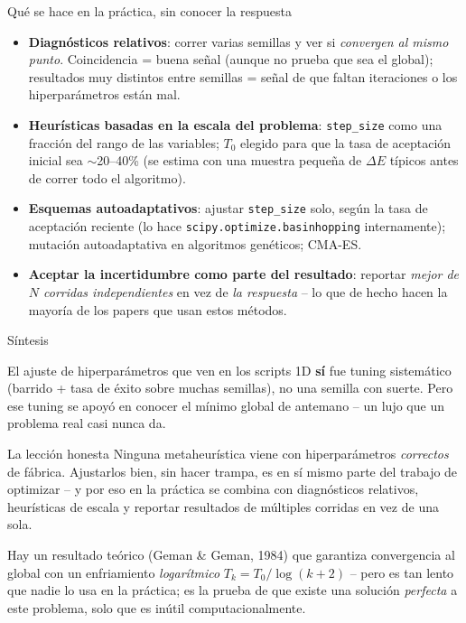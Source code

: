 \documentclass[aspectratio=169,10pt]{beamer}
\begin{document}
\begin{frame}{Qué se hace en la práctica, sin conocer la respuesta}
  \begin{itemize}
    \item \textbf{Diagnósticos relativos}: correr varias semillas y
      ver si \emph{convergen al mismo punto}. Coincidencia = buena
      señal (aunque no prueba que sea el global); resultados muy
      distintos entre semillas = señal de que faltan iteraciones o
      los hiperparámetros están mal.
    \item \textbf{Heurísticas basadas en la escala del problema}:
      \texttt{step\_size} como una fracción del rango de las
      variables; $T_0$ elegido para que la tasa de aceptación inicial
      sea $\sim$20--40\% (se estima con una muestra pequeña de
      $\Delta E$ típicos antes de correr todo el algoritmo).
    \item \textbf{Esquemas autoadaptativos}: ajustar
      \texttt{step\_size} solo, según la tasa de aceptación reciente
      (lo hace \texttt{scipy.optimize.basinhopping} internamente);
      mutación autoadaptativa en algoritmos genéticos; CMA-ES.
    \item \textbf{Aceptar la incertidumbre como parte del resultado}:
      reportar \emph{mejor de $N$ corridas independientes} en vez de
      \emph{la respuesta} -- lo que de hecho hacen la mayoría de los papers que
      usan estos métodos.
  \end{itemize}
\end{frame}

\begin{frame}{Síntesis}
  \begin{block}{}
    El ajuste de hiperparámetros que ven en los scripts 1D \textbf{sí}
    fue tuning sistemático (barrido + tasa de éxito sobre muchas
    semillas), no una semilla con suerte. Pero ese tuning se apoyó en
    conocer el mínimo global de antemano -- un lujo que un problema
    real casi nunca da.
  \end{block}
  \begin{exampleblock}{La lección honesta}
    Ninguna metaheurística viene con hiperparámetros \emph{correctos}
    de fábrica. Ajustarlos bien, sin hacer trampa, es en sí mismo
    parte del trabajo de optimizar -- y por eso en la práctica se
    combina con diagnósticos relativos, heurísticas de escala y
    reportar resultados de múltiples corridas en vez de una sola.
  \end{exampleblock}
  \small Hay un resultado teórico (Geman \& Geman, 1984) que garantiza
  convergencia al global con un enfriamiento \emph{logarítmico}
  $T_k=T_0/\log(k+2)$ -- pero es tan lento que nadie lo usa en la
  práctica; es la prueba de que existe una solución \emph{perfecta} a este
  problema, solo que es inútil computacionalmente.
\end{frame}
\end{document}
